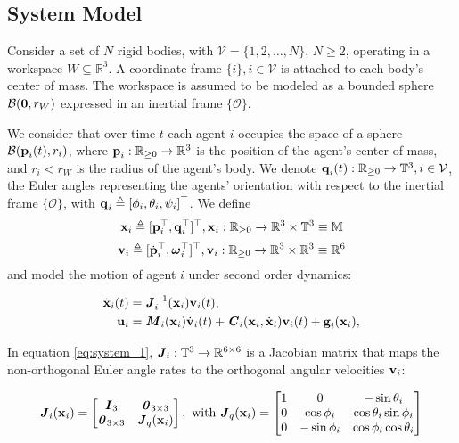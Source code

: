 \subsection{System Model}

Consider a set of $N$ rigid bodies, with $\mathcal{V} = \{ 1,2, \ldots, N\}$,
$N  \geq 2$, operating in a workspace $W\subseteq \mathbb{R}^3$.
A coordinate frame $\{i\}, i\in\mathcal{V}$ is attached to each body's
center of mass. The workspace is assumed to be modeled as a
bounded sphere $\mathcal{B}(\bm{\mathbf{0}},r_W)$ expressed in an inertial frame
$\{\mathcal{O}\}$.

We consider that over time $t$ each agent $i$ occupies the space of a sphere
$\mathcal{B}(\bm{\mathbf{p}}_i(t), r_i)$, where $\bm{\mathbf{p}}_i : \mathbb{R}_{\geq 0} \to \mathbb{R}^3$
is the position of the agent's center of mass, and $r_i < r_W$ is the radius of the
agent's body. We denote $\bm{\mathbf{q}}_i(t):\mathbb{R}_{\geq 0} \to \mathbb{T}^3, i\in\mathcal{V}$,
the Euler angles representing the agents' orientation with respect to the
inertial frame $\{\mathcal{O}\}$,
with $\bm{\mathbf{q}}_i \triangleq [\phi_i,\theta_i,\psi_i]^{\top}$.
We define
$$\bm{\mathbf{x}}_i \triangleq [\bm{\mathbf{p}}^{\top}_i,\bm{\mathbf{q}}^{\top}_i]^{\top},
\bm{\mathbf{x}}_i:\mathbb{R}_{\geq 0} \to \mathbb{R}^3\times \mathbb{T}^3 \equiv \mathbb{M}$$
$$\bm{\mathbf{v}}_i \triangleq [\dot{\bm{\mathbf{p}}}^{\top}_i, \bm{\mathbf{\omega}}^{\top}_i]^{\top},
\bm{\mathbf{v}}_i : \mathbb{R}_{\geq 0} \to \mathbb{R}^3\times \mathbb{R}^3 \equiv \mathbb{R}^6$$
and model the motion of agent $i$ under second order dynamics:

\begin{subequations}
	\begin{align}
    \dot{\bm{\mathbf{x}}}_i(t) &= \bm{\mathit{J}}_i^{-1}(\bm{\mathbf{x}}_i) \bm{\mathbf{v}}_i(t), \label{eq:system_1} \\
    \bm{\mathbf{u}}_i &= \bm{\mathit{M}}_i(\bm{\mathbf{x}}_i) \dot{\bm{\mathbf{v}}}_i(t) + \bm{\mathit{C}}_i(\bm{\mathbf{x}}_i,\dot{\bm{\mathbf{x}}}_i) \bm{\mathbf{v}}_i(t)+\bm{\mathbf{g}}_i(\bm{\mathbf{x}}_i), \label{eq:system_2}
	\end{align}
  \label{eq:system}
\end{subequations}

In equation \eqref{eq:system_1}, $\bm{\mathit{J}}_i:\mathbb{T}^3 \to \mathbb{R}^{6\times6}$ is
a Jacobian matrix that maps the non-orthogonal Euler angle rates to the
orthogonal angular velocities $\bm{\mathbf{v}}_i$:

\begin{equation}
  \bm{\mathit{J}}_i(\bm{\mathbf{x}}_i) =
  \begin{bmatrix}
    \bm{\mathit{I}}_3 & \bm{\mathit{0}}_{3 \times 3} \\
    \bm{\mathit{0}}_{3 \times 3} & \bm{\mathit{J}}_{ q }(\bm{\mathbf{x}}_i) \\
  \end{bmatrix} \notag, \text{ with }
  \bm{\mathit{J}}_q(\bm{\mathbf{x}}_i) =
  \begin{bmatrix}
    1 & 0 & -\sin\theta_i \\
    0 & \cos\phi_i & \cos\theta_i \sin\phi_i \\
    0 & - \sin\phi_i & \cos\phi_i \cos\theta_i
  \end{bmatrix} \notag
\end{equation}

